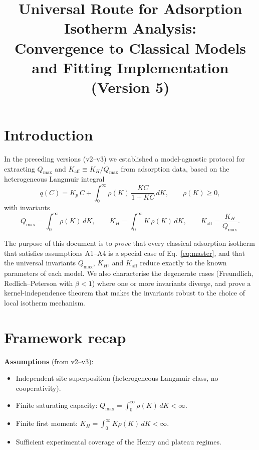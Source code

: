 \documentclass[12pt]{article}
\begin{document}
\title{Universal Route for Adsorption Isotherm Analysis:\\
Convergence to Classical Models and Fitting Implementation\\[6pt]
\large (Version 5)}
\author{}
\date{}
\maketitle

\section{Introduction}

In the preceding versions (v2--v3) we established a model-agnostic
protocol for extracting $Q_{\max}$ and
$K_{\mathrm{aff}}\equiv K_H/Q_{\max}$ from adsorption data, based on
the heterogeneous Langmuir integral
\begin{equation}
  q(C) = K_p\,C + \int_{0}^{\infty} \rho(K)\,\frac{KC}{1+KC}\,dK,
  \qquad \rho(K)\ge 0,
  \label{eq:master}
\end{equation}
with invariants
\begin{equation}
  Q_{\max} = \int_0^\infty \rho(K)\,dK, \qquad
  K_H = \int_0^\infty K\,\rho(K)\,dK, \qquad
  K_{\mathrm{aff}} = \frac{K_H}{Q_{\max}}.
  \label{eq:invariants}
\end{equation}

The purpose of this document is to \emph{prove} that every classical
adsorption isotherm that satisfies assumptions A1--A4 is a special
case of Eq.~\eqref{eq:master}, and that the universal invariants
$Q_{\max}$, $K_H$, and $K_{\mathrm{aff}}$ reduce exactly to the
known parameters of each model.  We also characterise the degenerate
cases (Freundlich, Redlich--Peterson with $\beta<1$) where one or more
invariants diverge, and prove a kernel-independence theorem that makes
the invariants robust to the choice of local isotherm mechanism.

\section{Framework recap}
\label{sec:framework}

\textbf{Assumptions} (from v2--v3):
\begin{itemize}[nosep]
  \item[A1.] Independent-site superposition (heterogeneous Langmuir
        class, no cooperativity).
  \item[A2.] Finite saturating capacity:
        $Q_{\max}=\int_0^\infty\rho(K)\,dK<\infty$.
  \item[A3.] Finite first moment:
        $K_H=\int_0^\infty K\rho(K)\,dK<\infty$.
  \item[A4.] Sufficient experimental coverage of the Henry and plateau
        regimes.
\end{itemize}
\end{document}
